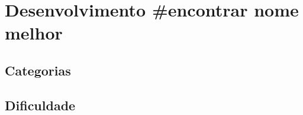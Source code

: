 \documentclass[11pt]{article}
\begin{document}
\section{Desenvolvimento \#encontrar nome melhor}
\label{sec:org365c5c7}
\subsection{Categorias}
\label{sec:orgb804cbe}

\subsection{Dificuldade}
\label{sec:org7064afb}
\end{document}
